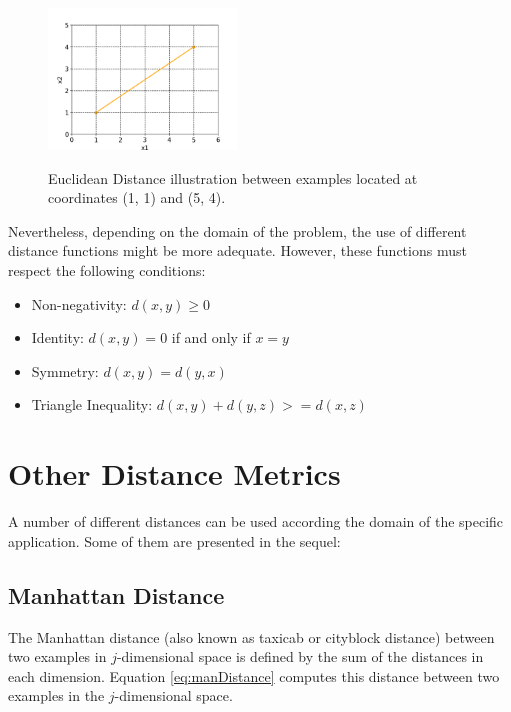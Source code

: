 \begin{figure}[h]
    \centering
    \includegraphics[height = 4.5cm, width =  5cm]{"Part 3 - Learning Systems/Supervised Learning/k-Nearest Neighbors/figures/EuclideanDistance2.png"}
    \caption{Euclidean Distance illustration between examples located at coordinates (1, 1) and (5, 4).}
    \label{fig:EucDistance}    
\end{figure}

Nevertheless, depending on the domain of the problem, the use of different distance functions might be more adequate. However, these functions must respect the following conditions:

\begin{itemize}
    \item Non-negativity: $d(x, y) \geq 0$
    \item Identity: $d(x, y) = 0$ if and only if $x = y$
    \item Symmetry: $d(x, y) = d(y, x)$    
    \item Triangle Inequality: $d(x, y) + d(y, z) >= d(x, z)$
\end{itemize} %

\section{Other Distance Metrics}

A number of different distances can be used according the domain of the specific application. Some of them are presented in the sequel:  

\subsection{Manhattan Distance}


The Manhattan distance \cite{Craw2010} (also known as taxicab or cityblock distance) between two examples in $j$-dimensional space is defined by the sum of the distances in each dimension. Equation \ref{eq:manDistance} computes this distance between two examples in the $j$-dimensional space.

